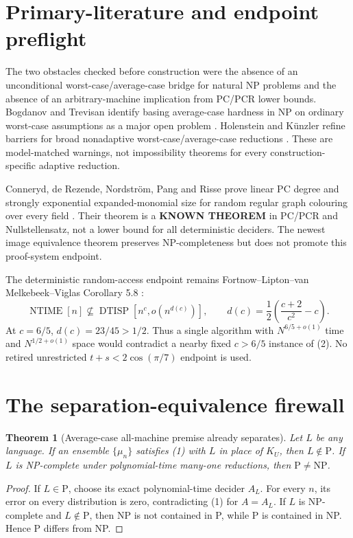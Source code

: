 \documentclass[11pt]{article}
\newtheorem{theorem}{Theorem}
\newcommand{\KU}{K_U}
\begin{document}
\section{Primary-literature and endpoint preflight}
The two obstacles checked before construction were the absence of an
unconditional worst-case/average-case bridge for natural NP problems and the
absence of an arbitrary-machine implication from PC/PCR lower bounds.
Bogdanov and Trevisan identify basing average-case hardness in NP on ordinary
worst-case assumptions as a major open problem \cite{bt}.  Holenstein and
K\"unzler refine barriers for broad nonadaptive worst-case/average-case
reductions \cite{hk}.  These are model-matched warnings, not impossibility
theorems for every construction-specific adaptive reduction.

Conneryd, de Rezende, Nordstr\"om, Pang and Risse prove linear PC degree and
strongly exponential expanded-monomial size for random regular graph
colouring over every field \cite{conneryd}.  Their theorem is a
\textbf{KNOWN THEOREM} in PC/PCR and Nullstellensatz, not a lower bound for
all deterministic deciders.  The newest image equivalence theorem preserves
NP-completeness but does not promote this proof-system endpoint.

The deterministic random-access endpoint remains Fortnow--Lipton--van
Melkebeek--Viglas Corollary 5.8 \cite{flmv}:
\[
 \operatorname{NTIME}[n]\not\subseteq
 \operatorname{DTISP}\!\left[n^c,
 o\!\left(n^{d(c)}\right)\right],
 \qquad
 d(c)=\frac12\left(\frac{c+2}{c^2}-c\right).              \tag{2}
\]
At $c=6/5$, $d(c)=23/45>1/2$.  Thus a single algorithm with
$N^{6/5+o(1)}$ time and $N^{1/2+o(1)}$ space would contradict a nearby fixed
$c>6/5$ instance of (2).  No retired unrestricted
$t+s<2\cos(\pi/7)$ endpoint is used.

\section{The separation-equivalence firewall}
\begin{theorem}[Average-case all-machine premise already separates]
Let $L$ be any language.  If an ensemble $\{\mu_n\}$ satisfies (1) with
$L$ in place of $\KU$, then $L\notin\mathrm P$.  If $L$ is NP-complete under
polynomial-time many-one reductions, then $\mathrm P\ne\mathrm{NP}$.
\end{theorem}
\begin{proof}
If $L\in\mathrm P$, choose its exact polynomial-time decider $A_L$.  For
every $n$, its error on every distribution is zero, contradicting (1) for
$A=A_L$.  If $L$ is NP-complete and $L\notin\mathrm P$, then NP is not
contained in P, while P is contained in NP.  Hence P differs from NP.
\end{proof}
\end{document}
